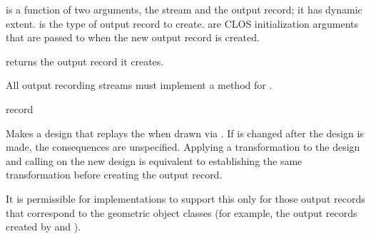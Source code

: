  is a function of two arguments, the stream and the output record;
it has dynamic extent.   is the type of output record to
create.   are CLOS initialization arguments that are passed to
 when the new output record is created.

 returns the output record it creates.

All output recording streams must implement a method for
.


 {record}

Makes a design that replays the   when drawn via
.  If  is changed after the design is made, the
consequences are unspecified.  Applying a transformation to the design and
calling  on the new design is equivalent to establishing the
same transformation before creating the output record.

It is permissible for implementations to support this only for those output
records that correspond to the geometric object classes (for example, the output
records created by  and ).
